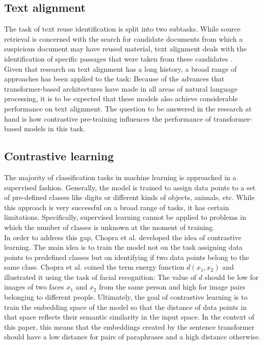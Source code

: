 \documentclass[11pt]{article}
\begin{document}
\subsection{Text alignment}
The task of text reuse identification is split into two subtasks. 
While source retrieval is concerned with the search for candidate documents from which a suspicious document may have reused material, text alignment deals with the identification of specific passages that were taken from these candidates \cite{potthast:2013e}.\\
Given that research on text alignment has a long history, a broad range of approaches has been applied to the task: %
Because of the advances that transformer-based architectures have made in all areas of natural language processing, it is to be expected that these models also achieve considerable performance on text alignment. %
The question to be answered in the research at hand is how contrastive pre-training influences the performance of transformer-based models in this task.


\subsection{Contrastive learning}
\label{sec:contrLearn}
The majority of classification tasks in machine learning is approached in a supervised fashion.
Generally, the model is trained to assign data points to a set of pre-defined classes like digits or different kinds of objects, animals, etc. %
While this approach is very successful on a broad range of tasks, it has certain limitations.
Specifically, supervised learning cannot be applied to problems in which the number of classes is unknown at the moment of training. \\
In order to address this gap, Chopra et al. \cite{chopra:2005} developed the idea of contrastive learning.
The main idea is to train the model not on the task assigning data points to predefined classes but on identifying if two data points belong to the same class.
Chopra et al. \cite{chopra:2005} coined the term energy function $d(x_1, x_2)$ and illustrated it using the task of facial recognition:
The value of $d$ should be low for images of two faces $x_1$ and $x_2$ from the same person and high for image pairs belonging to different people.
Ultimately, the goal of contrastive learning is to train the embedding space of the model so that the distance of data points in that space reflects their semantic similarity in the input space.
In the context of this paper, this means that the embeddings created by the sentence transformer should have a low distance for pairs of paraphrases and a high distance otherwise.
\end{document}
